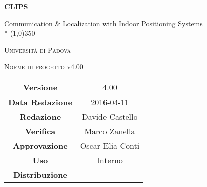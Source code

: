 \documentclass[a4paper,12pt]{article}
\author{Tavella Federico, Tombolato Andrea}
\date{04/03/2016}
\begin{document}
\begin{titlepage}
	\centering
	{\huge\bfseries CLIPS\par}
	Communication \& Localization with Indoor Positioning Systems \\*
	\line(1,0){350} \\
	{\scshape\LARGE Università di Padova \par}
	\vspace{1cm}
	{\scshape\Large Norme di progetto v4.00 \par}
	\logo
	\newpage
		\begin{tabular}{c|c}
			{\hfill \textbf{Versione}} 		& 4.00				\\
			{\hfill\textbf{Data Redazione}} 	& 2016-04-11		 	\\ 
			{\hfill\textbf{Redazione}} 		& Davide Castello		\\ 
			{\hfill\textbf{Verifica}} 		& Marco Zanella		\\
			{\hfill\textbf{Approvazione}} 		& Oscar Elia Conti		\\
			{\hfill\textbf{Uso}} 			& Interno			\\
			{\hfill\textbf{Distribuzione}} 		& \leaf				\\
		\end{tabular}
	\end{titlepage}
	\newpage
	\pagestyle{myfront}
	
		\newpage
			\tableofcontents
		\newpage
			\listoffigures	
	\label{LastFrontPage}
	\newpage
	\pagestyle{mymain}
         
    \newpage
		

	\newpage
		
	
	\newpage
		
	
	\newpage
		
		
	\label{LastPage}
\end{document}
